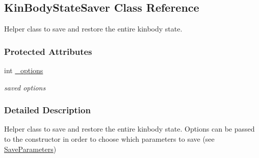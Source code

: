 \hypertarget{classOpenRAVE_1_1KinBody_1_1KinBodyStateSaver}{
\subsection{KinBodyStateSaver Class Reference}
\label{classOpenRAVE_1_1KinBody_1_1KinBodyStateSaver}
}


Helper class to save and restore the entire kinbody state.  


\subsubsection*{Protected Attributes}
\begin{DoxyCompactItemize}
\item 
\hypertarget{classOpenRAVE_1_1KinBody_1_1KinBodyStateSaver_a20928871868b555189b97697f24ec986}{
int \hyperlink{classOpenRAVE_1_1KinBody_1_1KinBodyStateSaver_a20928871868b555189b97697f24ec986}{\_\-options}}
\label{classOpenRAVE_1_1KinBody_1_1KinBodyStateSaver_a20928871868b555189b97697f24ec986}

\begin{DoxyCompactList}\small\item\em saved options \item\end{DoxyCompactList}\end{DoxyCompactItemize}


\subsubsection{Detailed Description}
Helper class to save and restore the entire kinbody state. Options can be passed to the constructor in order to choose which parameters to save (see \hyperlink{classOpenRAVE_1_1KinBody_ac26237c033a41ea5d14733a01e1dd388}{SaveParameters}) 